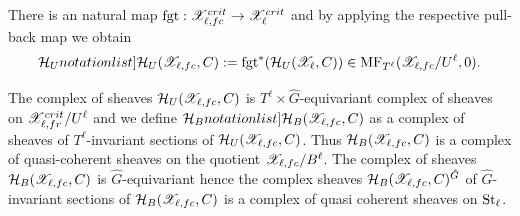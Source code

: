 There is an natural map $\mathrm{fgt}: \mathscr{X}^{crit}_{\ell,fc}\rightarrow\mathscr{X}^{crit}_{\ell}$ and by applying the respective pull-back map we obtain
$$\SymbolPrint{\mathcal{H}_U}(\calX_{\ell,fc},C):=\forg^*(\mathcal{H}_U(\calX_\ell, C))\in \MFs_{T^{\ell}}(\calX_{\ell,fc}/U^{\ell},0).$$


The complex of sheaves $\mathcal{H}_U(\mathscr{X}_{\ell,fc},C)$ is $T^\ell\times \hat{G}$-equivariant complex of sheaves on $\mathscr{X}^{crit}_{\ell,fr}/U^\ell$ and we define
$\SymbolPrint{\calH_B}(\calX_{\ell,fc},C)$ as a complex of sheaves of $T^\ell$-invariant sections of $\mathcal{H}_U(\mathscr{X}_{\ell,fc},C)$. Thus $\mathcal{H}_B(\mathscr{X}_{\ell,fc},C)$ is a
complex of quasi-coherent sheaves on the quotient $\mathscr{X}_{\ell,fc}/B^\ell$.
The complex of sheaves $\mathcal{H}_{B}(\mathscr{X}_{\ell,fc},C)$ is $\hat{G}$-equivariant hence the complex sheaves $\mathcal{H}_{B}(\mathscr{X}_{\ell,fc},C)^{\hat{G}}$ of $\hat{G}$-invariant sections of $\mathcal{H}_{B}(\mathscr{X}_{\ell,fc},C)$ is a complex of quasi coherent sheaves on
$\mathrm{St}_\ell$.%












